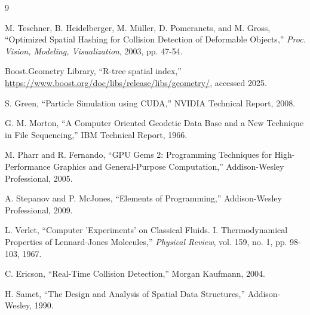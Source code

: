 \documentclass[11pt]{article}
\begin{document}
\begin{thebibliography}{9}

M. Teschner, B. Heidelberger, M. M\"uller, D. Pomeranets, and M. Gross,
``Optimized Spatial Hashing for Collision Detection of Deformable Objects,''
\textit{Proc. Vision, Modeling, Visualization}, 2003, pp. 47-54.

Boost.Geometry Library,
``R-tree spatial index,''
\url{https://www.boost.org/doc/libs/release/libs/geometry/},
accessed 2025.

S. Green,
``Particle Simulation using CUDA,''
NVIDIA Technical Report, 2008.

G. M. Morton,
``A Computer Oriented Geodetic Data Base and a New Technique in File Sequencing,''
IBM Technical Report, 1966.

M. Pharr and R. Fernando,
``GPU Gems 2: Programming Techniques for High-Performance Graphics and General-Purpose Computation,''
Addison-Wesley Professional, 2005.

A. Stepanov and P. McJones,
``Elements of Programming,''
Addison-Wesley Professional, 2009.

L. Verlet,
``Computer 'Experiments' on Classical Fluids. I. Thermodynamical Properties of Lennard-Jones Molecules,''
\textit{Physical Review}, vol. 159, no. 1, pp. 98-103, 1967.

C. Ericson,
``Real-Time Collision Detection,''
Morgan Kaufmann, 2004.

H. Samet,
``The Design and Analysis of Spatial Data Structures,''
Addison-Wesley, 1990.

\end{thebibliography}
\end{document}
